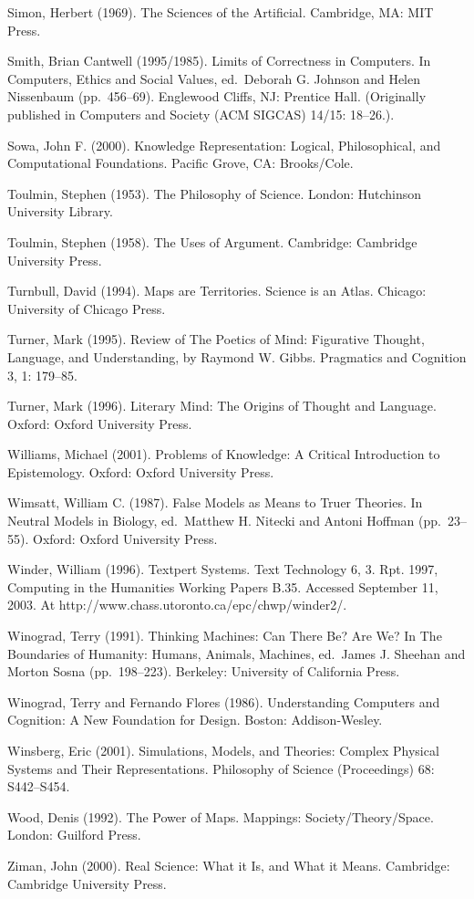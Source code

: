 Simon, Herbert (1969). The Sciences of the Artificial. Cambridge, MA:
MIT Press.

Smith, Brian Cantwell (1995/1985). Limits of Correctness in Computers.
In Computers, Ethics and Social Values, ed.~Deborah G. Johnson and Helen
Nissenbaum (pp.~456--69). Englewood Cliffs, NJ: Prentice Hall.
(Originally published in Computers and Society (ACM SIGCAS) 14/15:
18--26.).

Sowa, John F. (2000). Knowledge Representation: Logical, Philosophical,
and Computational Foundations. Pacific Grove, CA: Brooks/Cole.

Toulmin, Stephen (1953). The Philosophy of Science. London: Hutchinson
University Library.

Toulmin, Stephen (1958). The Uses of Argument. Cambridge: Cambridge
University Press.

Turnbull, David (1994). Maps are Territories. Science is an Atlas.
Chicago: University of Chicago Press.

Turner, Mark (1995). Review of The Poetics of Mind: Figurative Thought,
Language, and Understanding, by Raymond W. Gibbs. Pragmatics and
Cognition 3, 1: 179--85.

Turner, Mark (1996). Literary Mind: The Origins of Thought and Language.
Oxford: Oxford University Press.

Williams, Michael (2001). Problems of Knowledge: A Critical Introduction
to Epistemology. Oxford: Oxford University Press.

Wimsatt, William C. (1987). False Models as Means to Truer Theories. In
Neutral Models in Biology, ed.~Matthew H. Nitecki and Antoni Hoffman
(pp.~23--55). Oxford: Oxford University Press.

Winder, William (1996). Textpert Systems. Text Technology 6, 3. Rpt.
1997, Computing in the Humanities Working Papers B.35. Accessed
September 11, 2003. At http://www.chass.utoronto.ca/epc/chwp/winder2/.

Winograd, Terry (1991). Thinking Machines: Can There Be? Are We? In The
Boundaries of Humanity: Humans, Animals, Machines, ed.~James J. Sheehan
and Morton Sosna (pp.~198--223). Berkeley: University of California
Press.

Winograd, Terry and Fernando Flores (1986). Understanding Computers and
Cognition: A New Foundation for Design. Boston: Addison-Wesley.

Winsberg, Eric (2001). Simulations, Models, and Theories: Complex
Physical Systems and Their Representations. Philosophy of Science
(Proceedings) 68: S442--S454.

Wood, Denis (1992). The Power of Maps. Mappings: Society/Theory/Space.
London: Guilford Press.

Ziman, John (2000). Real Science: What it Is, and What it Means.
Cambridge: Cambridge University Press.
